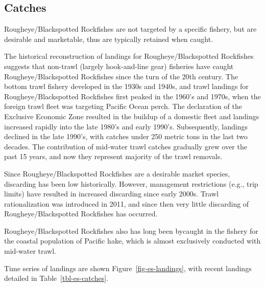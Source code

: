 \documentclass[
]{scrartcl}
\begin{document}
\subsection{Catches}\label{catches}

Rougheye/Blackspotted Rockfishes are not targeted by a specific fishery,
but are desirable and marketable, thus are typically retained when
caught.

The historical reconstruction of landings for Rougheye/Blackspotted
Rockfishes suggests that non-trawl (largely hook-and-line gear)
fisheries have caught Rougheye/Blackspotted Rockfishes since the turn of
the 20th century. The bottom trawl fishery developed in the 1930s and
1940s, and trawl landings for Rougheye/Blackspotted Rockfishes first
peaked in the 1960's and 1970s, when the foreign trawl fleet was
targeting Pacific Ocean perch. The declaration of the Exclusive Economic
Zone resulted in the buildup of a domestic fleet and landings increased
rapidly into the late 1980's and early 1990's. Subsequently, landings
declined in the late 1990's, with catches under 250 metric tons in the
last two decades. The contribution of mid-water trawl catches gradually
grew over the past 15 years, and now they represent majority of the
trawl removals.

Since Rougheye/Blackspotted Rockfishes are a desirable market species,
discarding has been low historically. However, management restrictions
(e.g., trip limits) have resulted in increased discarding since early
2000s. Trawl rationalization was introduced in 2011, and since then very
little discarding of Rougheye/Blackspotted Rockfishes has occurred.

Rougheye/Blackspotted Rockfishes also has long been bycaught in the
fishery for the coastal population of Pacific hake, which is almost
exclusively conducted with mid-water trawl.

Time series of landings are shown Figure~\ref{fig-es-landings}, with
recent landings detailed in Table~\ref{tbl-es-catches}.

\begingroup
\fontsize{7.5pt}{9.0pt}\selectfont
\end{document}
